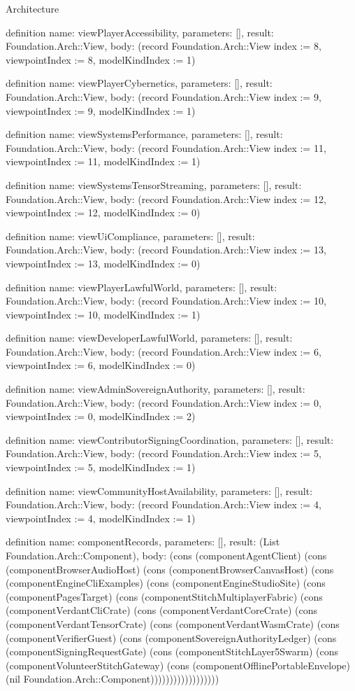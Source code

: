 \begin{lexlean}{Architecture}
\begin{semanticmodule}
definition{
  name: viewPlayerAccessibility,
  parameters: [],
  result: Foundation.Arch::View,
  body: (record Foundation.Arch::View {index := 8, viewpointIndex := 8, modelKindIndex := 1})
}

definition{
  name: viewPlayerCybernetics,
  parameters: [],
  result: Foundation.Arch::View,
  body: (record Foundation.Arch::View {index := 9, viewpointIndex := 9, modelKindIndex := 1})
}

definition{
  name: viewSystemsPerformance,
  parameters: [],
  result: Foundation.Arch::View,
  body: (record Foundation.Arch::View {index := 11, viewpointIndex := 11, modelKindIndex := 1})
}

definition{
  name: viewSystemsTensorStreaming,
  parameters: [],
  result: Foundation.Arch::View,
  body: (record Foundation.Arch::View {index := 12, viewpointIndex := 12, modelKindIndex := 0})
}

definition{
  name: viewUiCompliance,
  parameters: [],
  result: Foundation.Arch::View,
  body: (record Foundation.Arch::View {index := 13, viewpointIndex := 13, modelKindIndex := 0})
}

definition{
  name: viewPlayerLawfulWorld,
  parameters: [],
  result: Foundation.Arch::View,
  body: (record Foundation.Arch::View {index := 10, viewpointIndex := 10, modelKindIndex := 1})
}

definition{
  name: viewDeveloperLawfulWorld,
  parameters: [],
  result: Foundation.Arch::View,
  body: (record Foundation.Arch::View {index := 6, viewpointIndex := 6, modelKindIndex := 0})
}

definition{
  name: viewAdminSovereignAuthority,
  parameters: [],
  result: Foundation.Arch::View,
  body: (record Foundation.Arch::View {index := 0, viewpointIndex := 0, modelKindIndex := 2})
}

definition{
  name: viewContributorSigningCoordination,
  parameters: [],
  result: Foundation.Arch::View,
  body: (record Foundation.Arch::View {index := 5, viewpointIndex := 5, modelKindIndex := 1})
}

definition{
  name: viewCommunityHostAvailability,
  parameters: [],
  result: Foundation.Arch::View,
  body: (record Foundation.Arch::View {index := 4, viewpointIndex := 4, modelKindIndex := 1})
}

definition{
  name: componentRecords,
  parameters: [],
  result: (List Foundation.Arch::Component),
  body: (cons (componentAgentClient) (cons (componentBrowserAudioHost) (cons (componentBrowserCanvasHost) (cons (componentEngineCliExamples) (cons (componentEngineStudioSite) (cons (componentPagesTarget) (cons (componentStitchMultiplayerFabric) (cons (componentVerdantCliCrate) (cons (componentVerdantCoreCrate) (cons (componentVerdantTensorCrate) (cons (componentVerdantWasmCrate) (cons (componentVerifierGuest) (cons (componentSovereignAuthorityLedger) (cons (componentSigningRequestGate) (cons (componentStitchLayer5Swarm) (cons (componentVolunteerStitchGateway) (cons (componentOfflinePortableEnvelope) (nil Foundation.Arch::Component))))))))))))))))))
}


\end{semanticmodule}
\end{lexlean}
